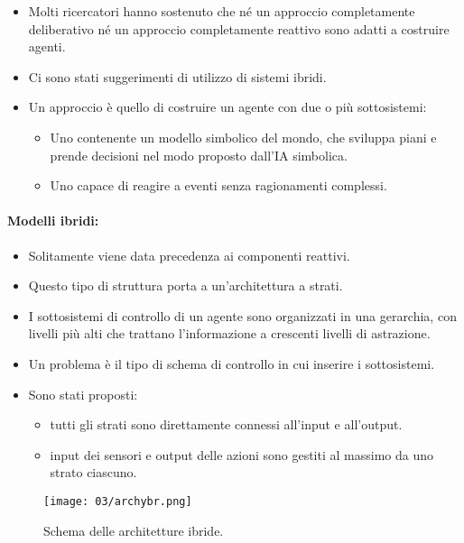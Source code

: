 \begin{itemize}
  \item Molti ricercatori hanno sostenuto che né un approccio completamente deliberativo né un approccio completamente reattivo sono adatti a costruire agenti. 
  \item Ci sono stati suggerimenti di utilizzo di sistemi ibridi. 
  \item Un approccio è quello di costruire un agente con due o più sottosistemi:
    \begin{itemize}
      \item Uno  contenente un modello simbolico del mondo, che sviluppa piani e prende decisioni nel modo proposto dall'IA simbolica. 
      \item Uno  capace di reagire a eventi senza ragionamenti complessi.
    \end{itemize}
\end{itemize}

\paragraph{Modelli ibridi:}

\begin{itemize}
  \item Solitamente viene data precedenza ai componenti reattivi. 
  \item Questo tipo di struttura porta a un'architettura a strati. 
  \item I sottosistemi di controllo di un agente sono organizzati in una gerarchia, con livelli più alti che trattano l'informazione a crescenti livelli di astrazione. 
  \item Un problema è il tipo di schema di controllo in cui inserire i sottosistemi. 
  \item Sono stati proposti:
    \begin{itemize}
      \item {} tutti gli strati sono direttamente connessi all'input e all'output. 
      \item {} input dei sensori e output delle azioni sono gestiti al massimo da uno strato ciascuno.
    \end{itemize}
\end{itemize}

\begin{figure}[!h]
    \centering
    \texttt{[image: 03/archybr.png]}
  \caption{Schema delle architetture ibride.}
\end{figure}







